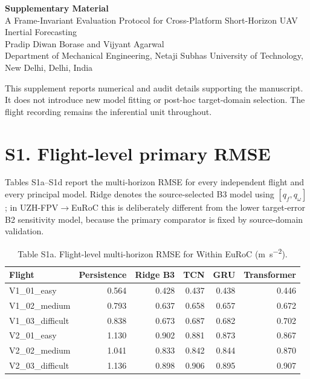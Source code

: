 \documentclass[11pt]{article}
\newcommand{\qf}{q_f}
\newcommand{\qw}{q_\omega}
\begin{document}
\begin{center}
{\Large\bfseries Supplementary Material}\\[0.5em]
{\large A Frame-Invariant Evaluation Protocol for Cross-Platform Short-Horizon UAV Inertial Forecasting}\\[0.8em]
Pradip Diwan Borase and Vijyant Agarwal\\
Department of Mechanical Engineering, Netaji Subhas University of Technology, New Delhi, Delhi, India
\end{center}
\vspace{0.5em}
\noindent This supplement reports numerical and audit details supporting the manuscript. It does not introduce new model fitting or post-hoc target-domain selection. The flight recording remains the inferential unit throughout.
\section*{S1. Flight-level primary RMSE}
Tables S1a--S1d report the multi-horizon RMSE for every independent flight and every principal model. Ridge denotes the source-selected B3 model using $[\qf,\qw]$; in UZH-FPV$\rightarrow$EuRoC this is deliberately different from the lower target-error B2 sensitivity model, because the primary comparator is fixed by source-domain validation.
\begin{table}[htbp]\centering
\caption*{Table S1a. Flight-level multi-horizon RMSE for Within EuRoC (\si{\metre\per\second\squared}).}
\scriptsize
\begin{tabular}{p{}rrrrr}
\toprule
Flight & Persistence & Ridge B3 & TCN & GRU & Transformer\\
\midrule
V1\_01\_easy & 0.564 & 0.428 & 0.437 & 0.438 & 0.446 \\
V1\_02\_medium & 0.793 & 0.637 & 0.658 & 0.657 & 0.672 \\
V1\_03\_difficult & 0.838 & 0.673 & 0.687 & 0.682 & 0.702 \\
V2\_01\_easy & 1.130 & 0.902 & 0.881 & 0.873 & 0.867 \\
V2\_02\_medium & 1.041 & 0.833 & 0.842 & 0.844 & 0.870 \\
V2\_03\_difficult & 1.136 & 0.898 & 0.906 & 0.895 & 0.907 \\
\bottomrule
\end{tabular}
\end{table}
\end{document}
